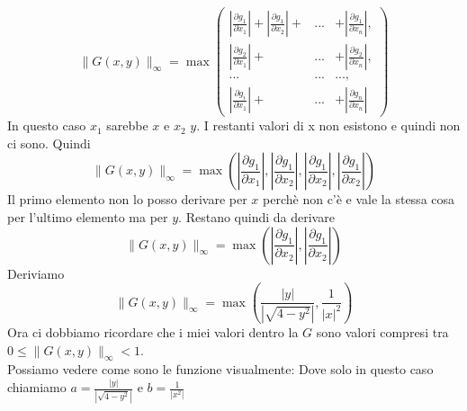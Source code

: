 \documentclass[11pt]{article}
\begin{document}
\[
\|G(x,y)\|_\infty= \max \left(
\begin{matrix}
|\frac{\partial g_1}{\partial x_1}|+|\frac{\partial g_1}{\partial x_2}|+ &...&+|\frac{\partial g_1}{\partial x_n}|,\\
|\frac{\partial g_2}{\partial x_1}|+&...&+|\frac{\partial g_2}{\partial x_n}|,\\
...&...&...,\\
|\frac{\partial g_i}{\partial x_1}|+&...&+|\frac{\partial g_n}{\partial x_n}|
\end{matrix}
\right)
\]
In questo caso $x_1$ sarebbe $x$ e $x_2$ $y$. I restanti valori di x non esistono e quindi non ci sono. Quindi
\[
\|G(x,y)\|_\infty= \max \left( |\frac{\partial g_1}{\partial x_1}|,|\frac{\partial g_1}{\partial x_2}|,|\frac{\partial g_1}{\partial x_2}|,|\frac{\partial g_1}{\partial x_2}| \right)
\]
Il primo elemento non lo posso derivare per $x$ perchè non c'è e vale la stessa cosa per l'ultimo elemento ma per $y$. Restano quindi da derivare 
\[
\|G(x,y)\|_\infty= \max \left( |\frac{\partial g_1}{\partial x_2}|,|\frac{\partial g_1}{\partial x_2}| \right)
\]
Deriviamo
\[
\|G(x,y)\|_\infty= \max \left({\frac{|y|}{|\sqrt{4-y^2}|},\frac{1}{|x|^2}}\right)
\]
Ora ci dobbiamo ricordare che i miei valori dentro la $G$ sono valori compresi tra $0\leq\|G(x,y)\|_\infty <1$.\\

Possiamo vedere come sono le funzione visualmente:
Dove solo in questo caso chiamiamo $a=\frac{|y|}{|\sqrt{4-y^2}|}$ e $b=\frac{1}{|x^2|}$\\
\end{document}
